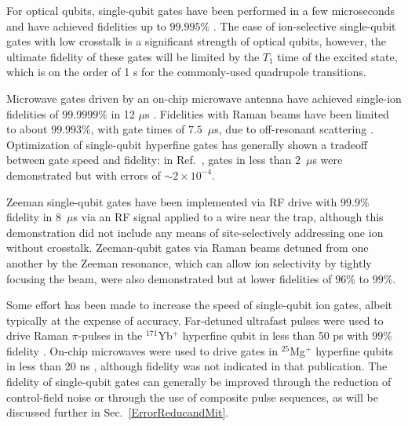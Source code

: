 \documentclass[%
reprint,
 amsmath,amssymb,
]{revtex4-1}
\begin{document}
For optical qubits, single-qubit gates have been performed in a few microseconds and have achieved fidelities up to $99.995 \%$ \cite{AkermanUniversal2015, BermudezAssessing2017}. The ease of ion-selective single-qubit gates with low crosstalk is a significant strength of optical qubits, however, the ultimate fidelity of these gates will be limited by the $T_1$ time of the excited state, which is on the order of 1 s for the commonly-used quadrupole transitions.

Microwave gates driven by an on-chip microwave antenna have achieved single-ion fidelities of $99.9999\%$ in 12 $\mu$s \cite{HartyHighFidelityIons2014}. Fidelities with Raman beams have been limited to about $99.993 \%$, with gate times of $7.5$~$\mu$s, due to off-resonant scattering \cite{Ballance2QubitHyperfineGate2016}. Optimization of single-qubit hyperfine gates has generally shown a tradeoff between gate speed and fidelity: in Ref.~\cite{Ballance2QubitHyperfineGate2016}, gates in less than $2$~$\mu$s were demonstrated but with errors of ${\sim}2 \times 10^{-4}$.

Zeeman single-qubit gates have been implemented via RF drive with $99.9 \%$ fidelity in $8$~$\mu$s \cite{KeselmanZeemanQubit2011} via an RF signal applied to a wire near the trap, although this demonstration did not include any means of site-selectively addressing one ion without crosstalk. Zeeman-qubit gates via Raman beams detuned from one another by the Zeeman resonance, which can allow ion selectivity by tightly focusing the beam, were also demonstrated \cite{PoschingerZeeman2009, Ruster2016} but at lower fidelities of $96 \%$ to $99 \%$.

Some effort has been made to increase the speed of single-qubit ion gates, albeit typically at the expense of accuracy. Far-detuned ultrafast pulses were used to drive Raman $\pi$-pulses in the $^{171}$Yb$^+$ hyperfine qubit in less than 50 ps with $99 \%$ fidelity \cite{CampbellUltrafast2010}. On-chip microwaves were used to drive gates in $^{25}$Mg$^+$ hyperfine qubits in less than 20 ns \cite{ospelkaus2011microwave}, although fidelity was not indicated in that publication.  The fidelity of single-qubit gates can generally be improved through the reduction of control-field noise or through the use of composite pulse sequences, as will be discussed further in Sec.~\ref{ErrorReducandMit}.
\end{document}
